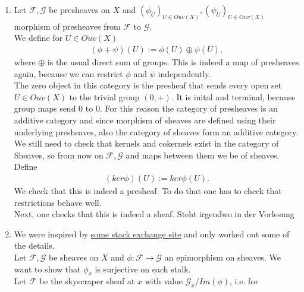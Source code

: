 \begin{exercise}{3}
    \begin{enumerate}
        \item Let $\mathcal{F}, \mathcal{G}$ be presheaves on $X$ and $(\phi_U)_{U\in Ouv(X)}, 
        (\psi_U)_{U\in Ouv(X)}$ morphism of presheaves from $\mathcal{F}$ to $\mathcal{G}$.\\
        We define for $U\in Ouv(X)$
        \begin{align*}
            (\phi+\psi)(U):=\phi(U)\oplus \psi(U),
        \end{align*}
        where $\oplus$ is the usual direct sum of groups.
        This is indeed a map of presheaves again, because we can
        restrict $\phi$ and $\psi$ independently.\\
        The zero object in this category is the presheaf that sends 
        every open set $U\in Ouv(X)$ to the trivial group $(0,+)$. 
        It is inital and terminal, because group maps send $0$ to $0$.
        For this reason the category of presheaves is an additive category
        and since morphism of sheaves are defined using their underlying
        presheaves, also the category of sheaves form an additive category.\\
        We still need to check that kernels and cokernels exist in the 
        category of Sheaves, so from now on $\mathcal{F},\mathcal{G}$
        and maps between them we be of sheaves.\\
        Define 
        \begin{align*}
            (ker\phi)(U):=ker\phi(U).
        \end{align*}
        We check that this is indeed a presheaf. To do that one has 
        to check that restrictions behave well.\\
        Next, one checks that this is indeed a sheaf.
        \iterate Steht irgendwo in der Vorlesung
    \item We were inspired by \href{https://math.stackexchange.com/questions/205658/an-easy-way-to-prove-that-epimorphism-of-sheaves-implies-surjectivity-on-stalk?rq=1}{some stack exchange site} 
        and only worked out some of the details.\\
    Let $\mathcal{F}, \mathcal{G}$ be sheaves on $X$ and $\phi:\mathcal{F}\to \mathcal{G}$ an 
    epimorphism on sheaves. We want to show that $\phi_x$ is surjective on each stalk.\\
    Let $\mathcal{F}$ be the skyscraper sheaf at $x$ with value $\mathcal{G}_x/Im(\phi)$, i.e. for 

\end{enumerate}
\end{exercise}
